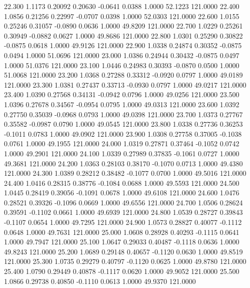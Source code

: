   22.300   1.1173   0.20092   0.20630  -0.0641   0.0388   1.0000  52.1223 121.0000
  22.400   1.0856   0.21256   0.22997  -0.0707   0.0398   1.0000  52.0303 121.0000
  22.600   1.0155   0.25246   0.31057  -0.0890   0.0636   1.0000  49.8209 121.0000
  22.700   1.0229   0.25261   0.30949  -0.0882   0.0627   1.0000  49.8686 121.0000
  22.800   1.0301   0.25290   0.30822  -0.0875   0.0618   1.0000  49.9126 121.0000
  22.900   1.0338   0.24874   0.30352  -0.0875   0.0494   1.0000  51.0696 121.0000
  23.000   1.0386   0.24944   0.30432  -0.0875   0.0497   1.0000  51.0376 121.0000
  23.100   1.0446   0.24983   0.30393  -0.0870   0.0500   1.0000  51.0068 121.0000
  23.200   1.0368   0.27288   0.33312  -0.0920   0.0797   1.0000  49.0189 121.0000
  23.300   1.0381   0.27437   0.33713  -0.0930   0.0797   1.0000  49.0217 121.0000
  23.400   1.0390   0.27568   0.34131  -0.0942   0.0796   1.0000  49.0256 121.0000
  23.500   1.0396   0.27678   0.34567  -0.0954   0.0795   1.0000  49.0313 121.0000
  23.600   1.0392   0.27750   0.35039  -0.0968   0.0793   1.0000  49.0398 121.0000
  23.700   1.0373   0.27767   0.35582  -0.0987   0.0790   1.0000  49.0545 121.0000
  23.800   1.0338   0.27736   0.36253  -0.1011   0.0783   1.0000  49.0902 121.0000
  23.900   1.0308   0.27758   0.37005  -0.1038   0.0761   1.0000  49.1955 121.0000
  24.000   1.0319   0.27871   0.37464  -0.1052   0.0742   1.0000  49.2901 121.0000
  24.100   1.0339   0.27989   0.37835  -0.1061   0.0727   1.0000  49.3681 121.0000
  24.200   1.0363   0.28103   0.38170  -0.1070   0.0713   1.0000  49.4380 121.0000
  24.300   1.0389   0.28212   0.38482  -0.1077   0.0700   1.0000  49.5016 121.0000
  24.400   1.0416   0.28315   0.38776  -0.1084   0.0688   1.0000  49.5593 121.0000
  24.500   1.0445   0.28419   0.39056  -0.1091   0.0678   1.0000  49.6108 121.0000
  24.600   1.0476   0.28521   0.39326  -0.1096   0.0669   1.0000  49.6556 121.0000
  24.700   1.0506   0.28624   0.39591  -0.1102   0.0661   1.0000  49.6939 121.0000
  24.800   1.0539   0.28727   0.39843  -0.1107   0.0654   1.0000  49.7295 121.0000
  24.900   1.0573   0.28827   0.40077  -0.1112   0.0648   1.0000  49.7631 121.0000
  25.000   1.0608   0.28928   0.40293  -0.1115   0.0641   1.0000  49.7947 121.0000
  25.100   1.0647   0.29033   0.40487  -0.1118   0.0636   1.0000  49.8243 121.0000
  25.200   1.0689   0.29148   0.40657  -0.1120   0.0630   1.0000  49.8519 121.0000
  25.300   1.0735   0.29279   0.40797  -0.1120   0.0625   1.0000  49.8780 121.0000
  25.400   1.0790   0.29449   0.40878  -0.1117   0.0620   1.0000  49.9052 121.0000
  25.500   1.0866   0.29738   0.40850  -0.1110   0.0613   1.0000  49.9370 121.0000
